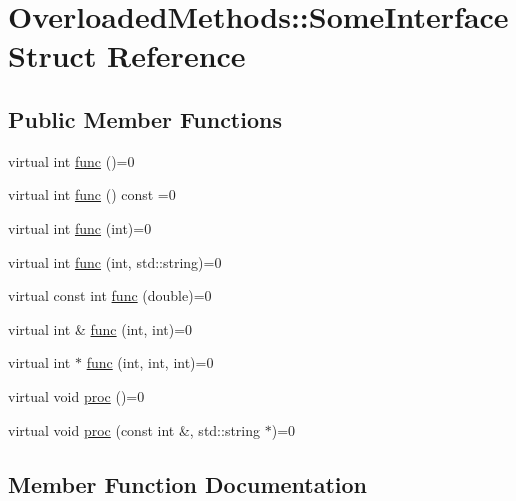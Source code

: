 \hypertarget{structOverloadedMethods_1_1SomeInterface}{}\section{Overloaded\+Methods\+::Some\+Interface Struct Reference}
\label{structOverloadedMethods_1_1SomeInterface}
\subsection*{Public Member Functions}
\begin{DoxyCompactItemize}
\item 
virtual int \mbox{\hyperlink{structOverloadedMethods_1_1SomeInterface_aefda4d0717948720f34c68b32ca6ff24}{func}} ()=0
\item 
virtual int \mbox{\hyperlink{structOverloadedMethods_1_1SomeInterface_a838e053d02a4172354b6478bd7f4a62c}{func}} () const =0
\item 
virtual int \mbox{\hyperlink{structOverloadedMethods_1_1SomeInterface_acac1d82f725b5205e5627f5d3fec54b1}{func}} (int)=0
\item 
virtual int \mbox{\hyperlink{structOverloadedMethods_1_1SomeInterface_a5103350d72645cb24e8b042307f3531e}{func}} (int, std\+::string)=0
\item 
virtual const int \mbox{\hyperlink{structOverloadedMethods_1_1SomeInterface_a89813c7ab9fd7e441efc5e933fab6095}{func}} (double)=0
\item 
virtual int \& \mbox{\hyperlink{structOverloadedMethods_1_1SomeInterface_a969562f151d77cb89bf8e720e8dbf782}{func}} (int, int)=0
\item 
virtual int $\ast$ \mbox{\hyperlink{structOverloadedMethods_1_1SomeInterface_a6bcb4e5f6e8d2d5d01d3452e9f5a1e7e}{func}} (int, int, int)=0
\item 
virtual void \mbox{\hyperlink{structOverloadedMethods_1_1SomeInterface_a0098b35a5303d3aadb94829cc7a2d805}{proc}} ()=0
\item 
virtual void \mbox{\hyperlink{structOverloadedMethods_1_1SomeInterface_a99f08cd10122063aaa09d671ad937f7c}{proc}} (const int \&, std\+::string $\ast$)=0
\end{DoxyCompactItemize}


\subsection{Member Function Documentation}
\mbox{\label{structOverloadedMethods_1_1SomeInterface_aefda4d0717948720f34c68b32ca6ff24}} 
